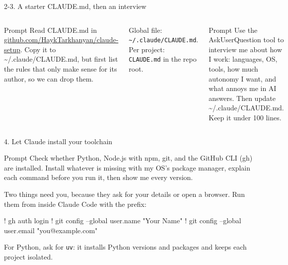 \documentclass[aspectratio=169,11pt,t]{beamer}
\begin{document}
\begin{frame}{2-3. A starter CLAUDE.md, then an interview}
  \begin{columns}[T,onlytextwidth]
      \par\vspace{0.3em}
      \begin{callout}[good]{Prompt}
        Read CLAUDE.md in \url{github.com/HaykTarkhanyan/claude-setup}. Copy it to \textasciitilde/.claude/CLAUDE.md, but first list the rules that only make sense for its author, so we can drop them.
      \end{callout}
      {\footnotesize\color{muted}Global file: \texttt{\textasciitilde/.claude/CLAUDE.md}. Per project: \texttt{CLAUDE.md} in the repo root.}
      \par\vspace{0.3em}
      \begin{callout}[good]{Prompt}
        Use the AskUserQuestion tool to interview me about how I work: languages, OS, tools, how much autonomy I want, and what annoys me in AI answers. Then update \textasciitilde/.claude/CLAUDE.md. Keep it under 100 lines.
      \end{callout}
  \end{columns}
\end{frame}

\begin{frame}[fragile]{4. Let Claude install your toolchain}
  \begin{callout}[good]{Prompt}
    Check whether Python, Node.js with npm, git, and the GitHub CLI (gh) are installed. Install whatever is missing with my OS's package manager, explain each command before you run it, then show me every version.
  \end{callout}
  \vspace{0.2em}
  \small Two things need you, because they ask for your details or open a browser. Run them from inside Claude Code with the \cmd{!} prefix:
\begin{code}[basicstyle=\ttfamily\scriptsize\color{codefg}]
! gh auth login
! git config --global user.name "Your Name"
! git config --global user.email "you@example.com"
\end{code}
  {\footnotesize\color{muted}For Python, ask for \texttt{uv}: it installs Python versions and packages and keeps each project isolated.}
\end{frame}
\end{document}
